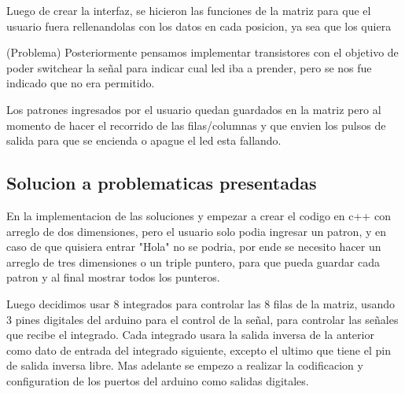 \documentclass{article}
\begin{document}
 \vspace{1cm}

Luego de crear la interfaz, se hicieron las funciones de la matriz para que el usuario fuera rellenandolas con los datos en cada posicion, ya sea que los quiera
 \vspace{1cm}




 \vspace{1cm}
 (Problema)
 Posteriormente pensamos implementar transistores con el objetivo de poder switchear la señal para indicar cual led iba a prender, pero se nos fue indicado que no era permitido.
 
\vspace{1cm}

Los patrones ingresados por el usuario quedan guardados en la matriz pero al momento de hacer el recorrido de las filas/columnas y que envien los pulsos de salida para que se encienda o apague el led esta fallando.





 




\vspace{5cm}

\subsection{Solucion a problematicas presentadas}

 En la implementacion de las soluciones y empezar a crear el codigo en c++ con arreglo de dos dimensiones, pero el usuario solo podia ingresar un patron, y en caso de que quisiera entrar "Hola" no se podria, por ende se necesito hacer un arreglo de tres dimensiones o un triple puntero, para que pueda guardar cada patron y al final mostrar todos los punteros.
 
   \vspace{1cm}
   
 
 Luego decidimos usar 8 integrados para controlar las 8 filas de la matriz, usando 3 pines digitales del arduino para el control de la señal, para controlar las señales que recibe el integrado.
 Cada integrado usara la salida inversa de la anterior como dato de entrada del integrado siguiente, excepto el ultimo que tiene el pin de salida inversa libre.
 Mas adelante se empezo a realizar la codificacion y configuration de los puertos del arduino como salidas digitales. 
 

  \vspace{1cm}
  
\end{document}
